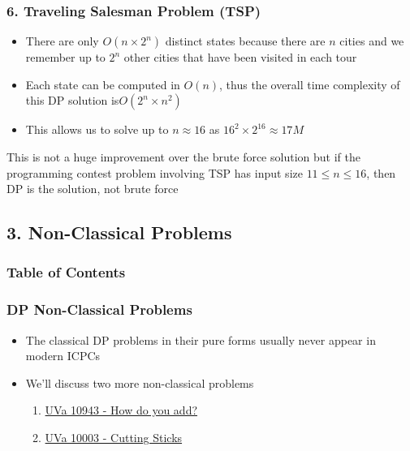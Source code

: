 \documentclass{beamer}
\begin{document}
\begin{frame}[fragile]
\frametitle{6. Traveling Salesman Problem (TSP)}

\begin{itemize}
    \item There are only $O(n \times 2^n)$ distinct states because there are $n$ cities and we remember up to $2^n$ other cities that have been visited in each tour
    \pause
    \item Each state can be computed in $O(n)$, thus the overall time complexity of this DP solution is$ O(2^n \times n^2)$
    
    \pause
    \item This allows us to solve up to $n \approx 16$ as $16^2 \times 2^{16} \approx 17M$
\end{itemize}

\pause
\vspace{0.3cm}

\color{blue}
This is not a huge improvement over the brute force solution but if the programming contest problem involving TSP has input size $11 \leq n \leq 16$, then DP is the solution, not brute force
\color{black}

\end{frame}


\subsection{3. Non-Classical Problems}
\begin{frame}
	\frametitle{Table of Contents}
\end{frame}

\begin{frame}[fragile]
\frametitle{DP Non-Classical Problems}

\begin{itemize}
    \item The classical DP problems in their pure forms usually never appear in modern ICPCs
    \item We'll discuss two more non-classical problems
    	\begin{enumerate}
		    \item \href{https://onlinejudge.org/index.php?option=com_onlinejudge&Itemid=8&category=21&page=show_problem&problem=1884}{UVa 10943 - How do you add?}
		    \item \href{https://onlinejudge.org/index.php?option=com_onlinejudge&Itemid=8&category=12&page=show_problem&problem=944}{UVa 10003 - Cutting Sticks}
		\end{enumerate}
\end{itemize}

\end{frame}
\end{document}
